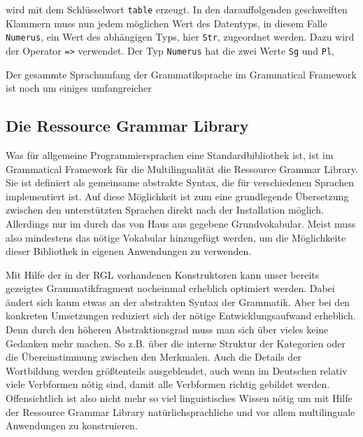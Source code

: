 \documentclass[12pt,abstract=on,titlepage,bibliography=totoc,ngerman,listof=totoc]{scrreprt}
\begin{document}
wird mit dem Schlüsselwort \texttt{table} erzeugt. In den darauffolgenden geschweiften Klammern muss nun jedem möglichen Wert des Datentyps, in diesem Falle \texttt{Numerus}, ein Wert des abhängigen Typs, hier \texttt{Str}, zugeordnet werden. Dazu wird der Operator \texttt{=>} verwendet. Der Typ \texttt{Numerus} hat die zwei Werte \texttt{Sg} und \texttt{Pl}, 

Der gesammte Sprachumfang der Grammatiksprache im Grammatical Framework ist noch um einiges umfangreicher
\FloatBarrier
\subsection{Die Ressource Grammar Library}
\label{subsec:rgl}
Was für allgemeine Programmiersprachen eine Standardbibliothek ist, ist im Grammatical Framework für die Multilingualität die Ressource Grammar Library. Sie ist definiert als gemeinsame abstrakte Syntax, die für verschiedenen Sprachen implementiert ist. Auf diese Möglichkeit ist zum eine grundlegende Übersetzung zwischen den unterstützten Sprachen direkt nach der Installation möglich. Allerdings nur im durch das von Haus aus gegebene Grundvokabular. Meist muss also mindestens das nötige Vokabular hinzugefügt werden, um die Möglichkeite dieser Bibliothek in eigenen Anwendungen zu verwenden. \par
Mit Hilfe der in der RGL vorhandenen Konstruktoren kann unser bereits gezeigtes Grammatikfragment nocheinmal erheblich optimiert werden. Dabei ändert sich kaum etwas an der abstrakten Syntax der Grammatik. Aber bei den konkreten Umsetzungen reduziert sich der nötige Entwicklungsaufwand erheblich. Denn durch den höheren Abstraktionsgrad muss man sich über vieles keine Gedanken mehr machen. So z.B. über die interne Struktur der Kategorien oder die Übereinstimmung zwischen den Merkmalen. Auch die Details der Wortbildung werden größtenteils ausgeblendet, auch wenn im Deutschen relativ viele Verbformen nötig sind, damit alle Verbformen richtig gebildet werden. Offensichtlich ist also nicht mehr so viel linguistisches Wissen nötig um mit Hilfe der Ressource Grammar Library natürlichsprachliche und vor allem multilinguale Anwendungen zu konstruieren.



\pagebreak
\FloatBarrier
\end{document}
